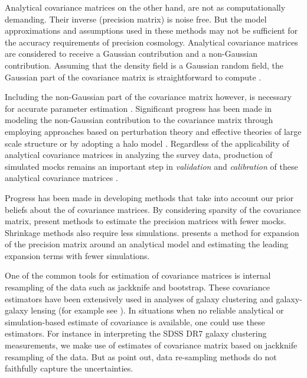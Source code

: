 Analytical covariance matrices on the other hand, are not as computationally demanding. Their inverse (precision matrix) 
is noise free. But the model approximations and assumptions used in these methods may not be sufficient 
for the accuracy requirements of precision cosmology. Analytical covariance matrices are considered to 
receive a Gaussian contribution and a non-Gaussian contribution. Assuming that the density field is a 
Gaussian random field, the Gaussian part of the covariance matrix is straightforward to compute \citep{grieb2016,klaus2016,slepian2016b}.

Including the non-Gaussian part of the covariance matrix however, is necessary for accurate parameter estimation \citep{takahashi2011,blot2016,chan2016}.
Significant progress has been made in modeling the non-Gaussian contribution to the covariance matrix through employing approaches based on perturbation 
theory and effective theories of large scale structure \citep{mohammed_seljak,mohammed2017} or by adopting a halo model \citep{takada_spergel,eifler2014}.
Regardless of the applicability of analytical covariance matrices in analyzing the survey data, production of simulated mocks remains an important step 
in \emph{validation} and \emph{calibration} of these analytical covariance matrices \citep{slepian2016b,hildebrandt2017}.

Progress has been made in developing methods that take into account our prior beliefs 
about the of covariance matrices. By considering sparsity of the covariance matrix, \citet{paz2015,padmanabhan2016} 
present methods to estimate the precision matrices with fewer mocks. Shrinkage methods \citep{pope2008,joachimi2016} 
also require less simulations. \citet{fried2017} presents a method for expansion of the precision matrix 
around an analytical model and estimating the leading expansion terms with fewer simulations.

One of the common tools for estimation of covariance matrices is internal resampling of the data such as jackknife and bootstrap. These covariance 
estimators have been extensively used in analyses of galaxy clustering and galaxy-galaxy lensing (for example see \citealt{reid2014,hod_vs_sham,singh2016,shirasaki,kwan2017}).
In situations when no reliable analytical or simulation-based estimate of covariance is available, one could use these estimators. 
For instance in interpreting the SDSS DR7 galaxy clustering measurements, we make use of estimates of covariance matrix based on 
jackknife resampling of the data. But as \citet{norberg,fried2016} point out, data re-sampling methods do not faithfully capture the 
uncertainties. 

